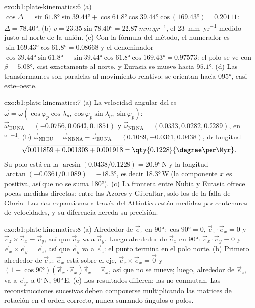 \begin{solution}{exo:b1:plate-kinematics:6}
(a) $\cos\Delta = \sin\ang{61.8}\sin\ang{39.44} + \cos\ang{61.8}\cos\ang{39.44}
\cos(\ang{169.43}) = 0.20111$: $\Delta = \ang{78.40}$. (b) $v = 23.35
\sin\ang{78.40} = \qty{22.87}{mm.yr^{-1}}$, el \qty{23}{mm.yr^{-1}} medido
justo al norte de la unión. (c) Con la fórmula del método, el numerador es
$\sin\ang{169.43}\cos\ang{61.8} = 0.08668$ y el denominador
$\cos\ang{39.44}\sin\ang{61.8} - \sin\ang{39.44}\cos\ang{61.8}\cos\ang{169.43}
= 0.97573$: el polo se ve con $\beta = \ang{5.08}$, casi exactamente al norte, y
Eurasia se mueve hacia $\ang{95.1}$. (d) Las transformantes son paralelas al
movimiento relativo: se orientan hacia \ang{095}, casi este--oeste.
\end{solution}

\begin{solution}{exo:b1:plate-kinematics:7}
(a) La velocidad angular del  es $\vec\omega = \omega(\cos\varphi_p\cos\lambda_p, \cos\varphi_p\sin\lambda_p,
\sin\varphi_p)$: $\vec\omega_{\mathrm{EU\,NA}} = (-0.0756, 0.0643, 0.1851)$ y
$\vec\omega_{\mathrm{NB\,NA}} = (0.0333, 0.0282, 0.2289)$, en
\unit{\degree\per\Myr}. (b) $\vec\omega_{\mathrm{NB\,EU}} =
\vec\omega_{\mathrm{NB\,NA}} - \vec\omega_{\mathrm{EU\,NA}} = (0.1089, -0.0361,
0.0438)$, de longitud
\[
  \sqrt{0.011859 + 0.001303 + 0.001918} = \qty{0.1228}{\degree\per\Myr}.
\]
Su polo está en la 
$\arcsin(0.0438/0.1228) = \ang{20.9}$\,N y la longitud
$\arctan(-0.0361/0.1089) = \ang{-18.3}$, es decir \ang{18.3}\,W (la
componente $x$ es positiva, así que no se suma \ang{180}). (c) La frontera entre
Nubia y Eurasia ofrece pocas medidas directas: entre las Azores y
Gibraltar, solo los  de la falla de Gloria. Las dos expansiones
a través del Atlántico están medidas por centenares de velocidades, y su diferencia
hereda su precisión.
\end{solution}

\begin{solution}{exo:b1:plate-kinematics:8}
(a) Alrededor de $\vec e_z$ en \ang{90}: $\cos\ang{90} = 0$, $\vec e_z\cdot\vec e_x = 0$
y $\vec e_z\times\vec e_x = \vec e_y$, así que $\vec e_x$ va a $\vec e_y$. Luego
alrededor de $\vec e_x$ en \ang{90}: $\vec e_x\cdot\vec e_y = 0$ y
$\vec e_x\times\vec e_y = \vec e_z$, así que $\vec e_y$ va a $\vec e_z$: el punto
termina en el polo norte. (b) Primero alrededor de $\vec e_x$: $\vec e_x$ está sobre el eje,
$\vec e_x\times\vec e_x = \vec 0$ y $(1 - \cos\ang{90})(\vec e_x\cdot\vec e_x)
\vec e_x = \vec e_x$, así que no se mueve; luego, alrededor de $\vec e_z$, va a
$\vec e_y$, a \ang{0}\,N, \ang{90}\,E. (c) Los resultados difieren: las  no conmutan. Las reconstrucciones sucesivas deben componerse
multiplicando las matrices de rotación en el orden correcto, nunca sumando ángulos
o polos.
\end{solution}

